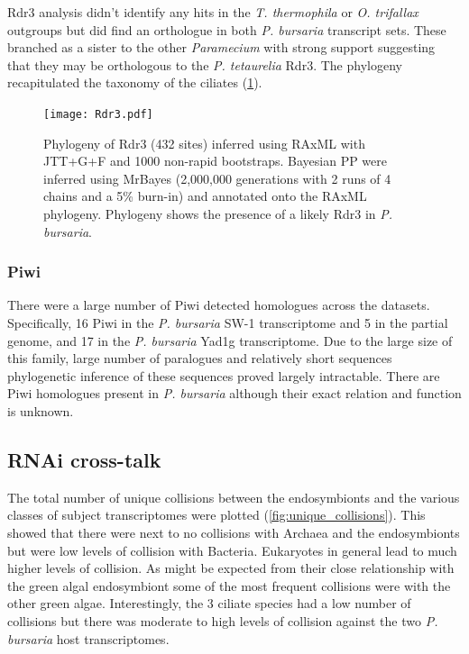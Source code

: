 Rdr3 analysis didn't identify any hits in the \textit{T. thermophila}
or \textit{O. trifallax} outgroups but did find an orthologue
in both \textit{P. bursaria} transcript sets.  These branched
as a sister to the other \textit{Paramecium} with strong support
suggesting that they may be orthologous to the \textit{P. tetaurelia}
Rdr3. The phylogeny recapitulated the taxonomy of the ciliates (\cref{fig:rdr3_phylo}).


\begin{figure}
    \texttt{[image: Rdr3.pdf]}
    \caption[Rdr3 Phylogeny]{Phylogeny of Rdr3 (432 sites)
        inferred using RAxML with JTT+G+F and 1000 non-rapid
        bootstraps. Bayesian PP were inferred using MrBayes
        (2,000,000 generations with 2 runs of 4 chains and a 5\% burn-in)
        and annotated onto the RAxML phylogeny.  Phylogeny
        shows the presence of a likely Rdr3 in \textit{P. bursaria}.}
    \label{fig:rdr3_phylo}
\end{figure}

\subsubsection{Piwi}

There were a large number of Piwi detected homologues across
the datasets. Specifically, 16 Piwi in the \textit{P. bursaria} SW-1
transcriptome and 5 in the partial genome, and 17 in the \textit{P. 
bursaria} Yad1g transcriptome.
Due to the large size of this family, large number of paralogues
and relatively short sequences phylogenetic inference
of these sequences proved largely intractable. There are Piwi
homologues present in \textit{P. bursaria} although their exact
relation and function is unknown.


\subsection{RNAi cross-talk}

The total number of unique collisions between the endosymbionts and 
the various classes of subject transcriptomes were plotted
(\cref{fig:unique_collisions}).  This showed that there 
were next to no collisions with Archaea and the endosymbionts but were
low levels of collision with Bacteria.  Eukaryotes in general
lead to much higher levels of collision.  As might be expected 
from their close relationship with the green algal endosymbiont
some of the most frequent collisions were with the other green algae.
Interestingly,
the 3 ciliate species had a low number of collisions but there
was moderate to high levels of collision against the two
\textit{P. bursaria} host transcriptomes.

